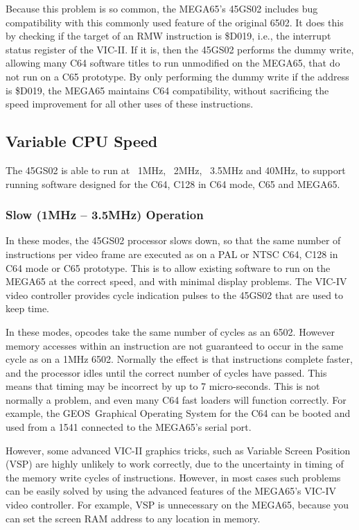 Because this problem is so common, the MEGA65's 45GS02 includes bug
compatibility with this
commonly used feature of the original 6502.  It does this by checking
if the target of an RMW
instruction is \$D019, i.e., the interrupt status register of the VIC-II.
If it is, then
the 45GS02 performs the dummy write, allowing many C64 software titles
to run unmodified on the
MEGA65, that do not run on a C65 prototype.  By only performing the
dummy write if the address
is \$D019, the MEGA65 maintains C64 compatibility, without sacrificing
the speed improvement
for all other uses of these instructions.

\subsection{Variable CPU Speed}

The 45GS02 is able to run at ~1MHz, ~2MHz, ~3.5MHz and 40MHz,
to support running software
designed for the C64, C128 in C64 mode, C65 and MEGA65.

\subsubsection{Slow (1MHz -- 3.5MHz) Operation}
In these modes, the 45GS02 processor slows down, so that the same number of instructions
per video frame are executed as on a PAL or NTSC C64, C128 in C64 mode or C65 prototype.
This is to allow existing software to run on the MEGA65 at the correct speed, and with
minimal display problems.  The VIC-IV video controller provides cycle indication pulses
to the 45GS02 that are used to keep time.

In these modes, opcodes take the same number of cycles as an 6502.
However memory accesses within an
instruction are not guaranteed to occur in the same cycle as on a 1MHz 6502.  Normally
the effect is that instructions complete faster, and the processor idles until the
correct number of cycles have passed. This means that timing may be incorrect by up to
7 micro-seconds.  This is not normally a problem, and even many C64 fast loaders will
function correctly. For example, the GEOS\texttrademark \ Graphical Operating System for the C64
can be booted and used from a 1541 connected to the MEGA65's serial port.

However, some advanced VIC-II graphics tricks, such as Variable Screen
Position (VSP) are
highly unlikely to work correctly, due to the uncertainty in timing of the memory write
cycles of instructions.  However, in most cases such problems can be
easily solved by using
the advanced features of the MEGA65's VIC-IV video controller.
For example, VSP is unnecessary
on the MEGA65, because you can set the screen RAM address to any location in memory.

